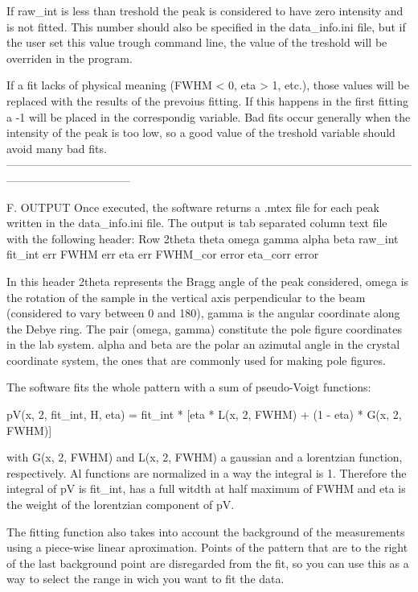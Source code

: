 If raw_int is less than treshold the peak is considered to have zero intensity and is not fitted. This number should also be specified in the data_info.ini file,
but if the user set this value trough command line, the value of the treshold will be overriden in the program.

If a fit lacks of physical meaning (FWHM < 0, eta > 1, etc.), those values will be replaced with the results of the prevoius fitting. If this happens in the first
fitting a -1 will be placed in the correspondig variable. Bad fits occur generally when the intensity of the peak is too low, so a good value of the treshold 
variable should avoid many bad fits.
---------------------------------------------------------------------------------------------------------------------------------------------

F. OUTPUT
Once executed, the software returns a .mtex file for each peak written in the data_info.ini file. The output is tab separated column text file with the following
header:
Row 2theta theta  omega gamma alpha  beta raw_int fit_int  err FWHM err eta err FWHM_cor error eta_corr error

In this header 2theta represents the Bragg angle of the peak considered, omega is the rotation of the sample in the vertical axis perpendicular to the beam 
(considered to vary between 0 and 180), gamma is the angular coordinate along the Debye ring. The pair (omega, gamma) constitute the pole figure coordinates in 
the lab system. alpha and beta are the polar an azimutal angle in the crystal coordinate system, the ones that are commonly used for making pole figures.

The software fits the whole pattern with a sum of pseudo-Voigt functions:

    pV(x, 2\theta, fit_int, H, eta) = fit_int * [eta * L(x, 2\theta, FWHM) + (1 - eta) * G(x, 2\theta, FWHM)]

with G(x, 2\theta, FWHM) and L(x, 2\theta, FWHM) a gaussian and a lorentzian function, respectively. Al functions are normalized in a way the integral is 1. 
Therefore the integral of pV is fit_int, has a full witdth at half maximum of FWHM and eta is the weight of the lorentzian component of pV.

The fitting function also takes into account the background of the measurements using a piece-wise linear aproximation. Points of the pattern that are to the
right of the last background point are disregarded from the fit, so you can use this as a way to select the range in wich you want to fit the data.


